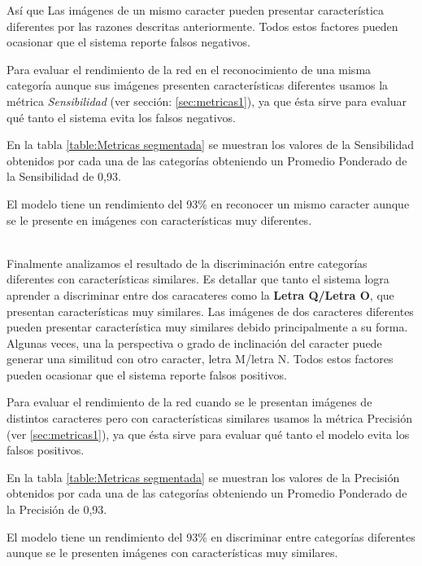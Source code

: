 Así que Las imágenes de un mismo caracter pueden presentar característica diferentes por las razones descritas anteriormente. Todos estos factores pueden ocasionar que el sistema reporte falsos negativos.  

Para evaluar el rendimiento de la red en el reconocimiento de una misma categoría aunque sus imágenes presenten características diferentes usamos la métrica \emph{Sensibilidad} (ver sección: \ref{sec:metricas1}), ya que ésta sirve para evaluar qué tanto el sistema evita los falsos negativos.

En la tabla \ref{table:Metricas segmentada} se muestran los valores de la Sensibilidad obtenidos por cada una de las categorías obteniendo un Promedio Ponderado de la Sensibilidad de 0,93. \\
\begin{tcolorbox}
[colback=blue!5!white,colframe=blue!45!black,fonttitle=\bfseries,title=Conclusión]
   El modelo tiene un rendimiento del 93\% en reconocer un mismo caracter aunque se le presente en imágenes con características muy diferentes.
\end{tcolorbox}\\

Finalmente analizamos el resultado de la discriminación entre categorías diferentes con características similares. Es detallar que tanto el sistema logra aprender a discriminar entre dos caracateres como la \textbf{Letra Q/Letra O}, que presentan características muy similares.  Las imágenes de dos caracteres diferentes pueden presentar característica muy similares debido principalmente a su forma. Algunas veces, una la perspectiva o grado de inclinación del caracter puede generar una similitud con otro caracter, letra M/letra N. Todos estos factores pueden ocasionar que el sistema reporte falsos positivos.

Para evaluar el rendimiento de la red cuando se le presentan imágenes de distintos caracteres pero con características similares usamos la métrica Precisión (ver \ref{sec:metricas1}), ya que ésta sirve para evaluar qué tanto el modelo evita los falsos positivos.

En la tabla \ref{table:Metricas segmentada} se muestran los valores de la Precisión obtenidos por cada una de las categorías obteniendo un Promedio Ponderado de la Precisión de 0,93.\\

\begin{tcolorbox}
[colback=blue!5!white,colframe=blue!45!black,fonttitle=\bfseries,title=Conclusión]
   El modelo tiene un rendimiento del 93\% en discriminar entre categorías diferentes aunque se le presenten imágenes con características muy similares.
\end{tcolorbox}\\

